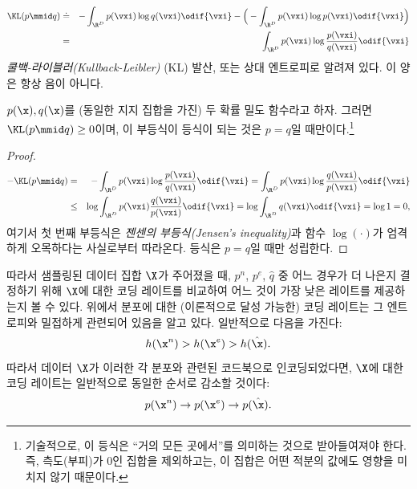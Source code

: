 \documentclass[../../book-main_ko.tex]{subfiles}
\begin{document}
\begin{eqnarray}
	\KL(p \mmid q) &\doteq& - \int_{\R^{D}} p(\vxi) \log q(\vxi) \odif{\vxi}  - \Big(- \int_{\R^{D}} p(\vxi) \log p(\vxi) \odif{\vxi} \Big)\\
	&=& \int_{\R^{D}} p(\vxi) \log \frac{p(\vxi)}{q(\vxi)} \odif{\vxi}
\end{eqnarray}
{\em 쿨백-라이블러(Kullback-Leibler)} (KL) 발산, 또는 상대 엔트로피로 알려져 있다. 이 양은 항상 음이 아니다.
\begin{theorem}[정보 부등식]\label{thm:information-inequality}
	$p(\x), q(\x)$를 (동일한 지지 집합을 가진) 두 확률 밀도 함수라고 하자. 그러면 $\KL(p\mmid q) \ge 0$이며, 이 부등식이 등식이 되는 것은 $p = q$일 때만이다.\footnote{기술적으로, 이 등식은 ``거의 모든 곳에서''를 의미하는 것으로 받아들여져야 한다. 즉, 측도(부피)가 0인 집합을 제외하고는, 이 집합은 어떤 적분의 값에도 영향을 미치지 않기 때문이다.}
\end{theorem}
\begin{proof}
	\begin{eqnarray*}
		- \KL(p\mmid q)
		&=& - \int_{\R^{D}} p(\vxi) \log \frac{p(\vxi)}{q(\vxi)} \odif{\vxi}
		=  \int_{\R^{D}} p(\vxi) \log \frac{q(\vxi)}{p(\vxi)} \odif{\vxi} \\
		&\le& \log \int_{\R^{D}} p(\vxi)  \frac{q(\vxi)}{p(\vxi)} \odif{\vxi} \label{eqn:jensen-KL}
		= \log \int_{\R^{D}} q(\vxi) \odif{\vxi} = \log 1 = 0,
	\end{eqnarray*}
	여기서 첫 번째 부등식은 {\em 젠센의 부등식(Jensen's inequality)}과 함수 $\log(\cdot)$가 엄격하게 오목하다는 사실로부터 따라온다. 등식은 $p = q$일 때만 성립한다.
\end{proof}

따라서 샘플링된 데이터 집합 $\X$가 주어졌을 때, $p^{n}$, $p^{e}$, $\hat{q}$ 중 어느 경우가 더 나은지 결정하기 위해 $\X$에 대한 코딩 레이트를 비교하여 어느 것이 가장 낮은 레이트를 제공하는지 볼 수 있다. 위에서 분포에 대한 (이론적으로 달성 가능한) 코딩 레이트는 그 엔트로피와 밀접하게 관련되어 있음을 알고 있다. 일반적으로 다음을 가진다:
\begin{equation}
	h(\x^n) > h(\x^e) > h(\hat \x).
\end{equation}
따라서 데이터 $\X$가 이러한 각 분포와 관련된 코드북으로 인코딩되었다면, $\X$에 대한 코딩 레이트는 일반적으로 동일한 순서로 감소할 것이다:
\begin{equation}
	p(\x^n) \rightarrow p(\x^e) \rightarrow p(\hat \x).
\end{equation}
\end{document}
